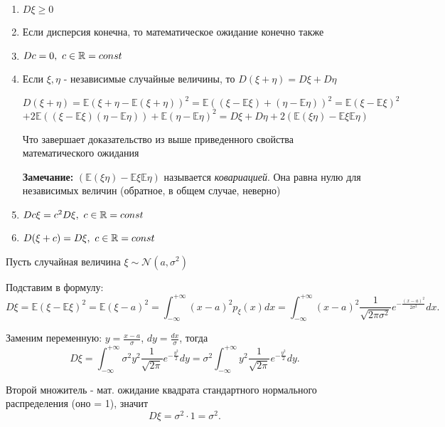 \begin{enumerate}
  \item $D\xi \ge 0$
  \item Если дисперсия конечна, то математическое ожидание конечно также
  \item $Dc = 0, \ c \in \mathbb{R} = const$
  \item Если \(\xi, \eta\) - независимые случайные величины, то $D(\xi + \eta) = D\xi + D\eta$
  
  \Proof
    \[D(\xi + \eta) = \mathbb{E}\left( \xi + \eta - \mathbb{E}(\xi + \eta) \right)^2
= \mathbb{E}\left( (\xi - \mathbb{E}\xi) + (\eta - \mathbb{E}\eta) \right)^2
= \mathbb{E}\left( \xi - \mathbb{E}\xi \right)^2 \] \[
+ 2\mathbb{E}\left( (\xi - \mathbb{E}\xi)(\eta - \mathbb{E}\eta)\right)
+ \mathbb{E}\left( \eta - \mathbb{E}\eta \right)^2= D\xi + D\eta + 2 \left( \mathbb{E}(\xi \eta) - \mathbb{E}\xi \mathbb{E}\eta \right)\]

  Что завершает доказательство из выше приведенного свойства математического ожидания

  \End 
  
  \textbf{Замечание:}  $\left( \mathbb{E}(\xi \eta) - \mathbb{E}\xi \mathbb{E}\eta \right)$ называется \textit{ковариацией}. Она равна нулю для независимых величин (обратное, в общем случае, неверно)

  \item $Dc\xi = c^2 D\xi, \ c \in \mathbb{R} = const$
  \item $D(\xi + c) = D\xi, \ c \in \mathbb{R} = const$
\end{enumerate}


\Example

Пусть случайная величина $\xi \sim \mathcal{N}(a, \sigma^2)$

Подставим в формулу:
\[
D\xi = \mathbb{E}(\xi - \mathbb{E}\xi)^2 = \mathbb{E}(\xi - a)^2 = \int_{-\infty}^{+\infty} (x-a)^2 p_\xi(x) dx = \int_{-\infty}^{+\infty} (x-a)^2 \frac{1}{\sqrt{2\pi\sigma^2}} e^{-\frac{(x-a)^2}{2\sigma^2}} dx.
\]

Заменим переменную: $y = \frac{x-a}{\sigma}$, \(dy = \frac{dx}{\sigma}\), тогда
\[
D\xi = \int_{-\infty}^{+\infty} \sigma^2 y^2 \frac{1}{\sqrt{2\pi}} e^{-\frac{y^2}{2}} dy = \sigma^2 \int_{-\infty}^{+\infty} y^2 \frac{1}{\sqrt{2\pi}} e^{-\frac{y^2}{2}} dy.
\]

Второй множитель - мат. ожидание квадрата стандартного нормального распределения (оно = 1), значит
\[
D\xi = \sigma^2 \cdot 1 = \sigma^2.
\]
